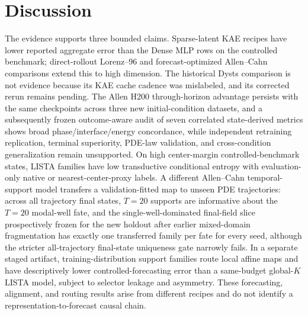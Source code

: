 \documentclass[11pt]{article}
\begin{document}
\begin{table}[tbp]
\centering
\caption{Staged \(F_{\rm abs}^{\rm route}\)-routed local affine forecasting on the controlled benchmark. The same-architecture, same-budget global-\(K\) LISTA baseline has \(d_z=256\), but checkpoint selection is asymmetric: the staged selector overlaps the first \(32/100\) reported starts, whereas the global selector uses distinct starts. Both rows also select cadence on the reported starts over the same fixed grid. Pair counts are descriptive nested system--seed outcomes; the last column counts pairs won by the routed model at H100, H500, and H1000 simultaneously. Lower MSEs and ratios are better.}
\label{tab:fabs_local_k_forecasting}
{\setlength{\tabcolsep}{4pt}
\resizebox{0.92\textwidth}{!}{}}
\end{table}

\section{Discussion}
\label{sec:discussion}

The evidence supports three bounded claims. Sparse-latent KAE recipes have lower reported aggregate error than the Dense MLP rows on the controlled benchmark; direct-rollout Lorenz--96 and forecast-optimized Allen--Cahn comparisons extend this to high dimension. The historical Dysts comparison is not evidence because its KAE cache cadence was mislabeled, and its corrected rerun remains pending. The Allen H200 through-horizon advantage persists with the same checkpoints across three new initial-condition datasets, and a subsequently frozen outcome-aware audit of seven correlated state-derived metrics shows broad phase/interface/energy concordance, while independent retraining replication, terminal superiority, PDE-law validation, and cross-condition generalization remain unsupported. On high center-margin controlled-benchmark states, LISTA families have low transductive conditional entropy with evaluation-only native or nearest-center-proxy labels. A different Allen--Cahn temporal-support model transfers a validation-fitted map to unseen PDE trajectories: across all trajectory final states, \(T=20\) supports are informative about the \(T=20\) modal-well fate, and the single-well-dominated final-field slice prospectively frozen for the new holdout after earlier mixed-domain fragmentation has exactly one transferred family per fate for every seed, although the stricter all-trajectory final-state uniqueness gate narrowly fails. In a separate staged artifact, training-distribution support families route local affine maps and have descriptively lower controlled-forecasting error than a same-budget global-\(K\) LISTA model, subject to selector leakage and asymmetry. These forecasting, alignment, and routing results arise from different recipes and do not identify a representation-to-forecast causal chain.
\end{document}
